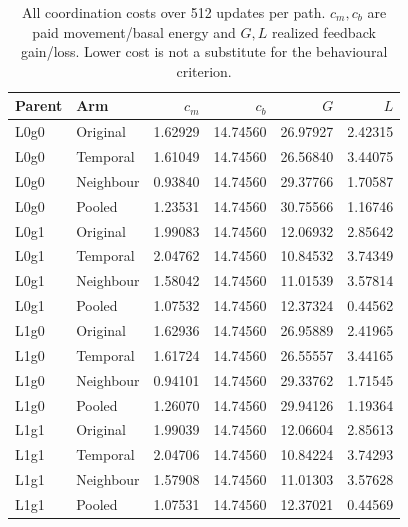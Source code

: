 \begin{table}[htbp]\centering\scriptsize
\caption{All coordination costs over 512 updates per path. $c_m,c_b$ are paid movement/basal energy and $G,L$ realized feedback gain/loss. Lower cost is not a substitute for the behavioural criterion.}\label{tab:coordination-costs}
\setlength{\tabcolsep}{3.5pt}\begin{tabular}{llrrrr}\toprule
Parent & Arm & $c_m$ & $c_b$ & $G$ & $L$\\\midrule
L0g0 & Original & 1.62929 & 14.74560 & 26.97927 & 2.42315 \\
L0g0 & Temporal & 1.61049 & 14.74560 & 26.56840 & 3.44075 \\
L0g0 & Neighbour & 0.93840 & 14.74560 & 29.37766 & 1.70587 \\
L0g0 & Pooled & 1.23531 & 14.74560 & 30.75566 & 1.16746 \\
L0g1 & Original & 1.99083 & 14.74560 & 12.06932 & 2.85642 \\
L0g1 & Temporal & 2.04762 & 14.74560 & 10.84532 & 3.74349 \\
L0g1 & Neighbour & 1.58042 & 14.74560 & 11.01539 & 3.57814 \\
L0g1 & Pooled & 1.07532 & 14.74560 & 12.37324 & 0.44562 \\
L1g0 & Original & 1.62936 & 14.74560 & 26.95889 & 2.41965 \\
L1g0 & Temporal & 1.61724 & 14.74560 & 26.55557 & 3.44165 \\
L1g0 & Neighbour & 0.94101 & 14.74560 & 29.33762 & 1.71545 \\
L1g0 & Pooled & 1.26070 & 14.74560 & 29.94126 & 1.19364 \\
L1g1 & Original & 1.99039 & 14.74560 & 12.06604 & 2.85613 \\
L1g1 & Temporal & 2.04706 & 14.74560 & 10.84224 & 3.74293 \\
L1g1 & Neighbour & 1.57908 & 14.74560 & 11.01303 & 3.57628 \\
L1g1 & Pooled & 1.07531 & 14.74560 & 12.37021 & 0.44569 \\
\bottomrule\end{tabular}\end{table}\FloatBarrier


